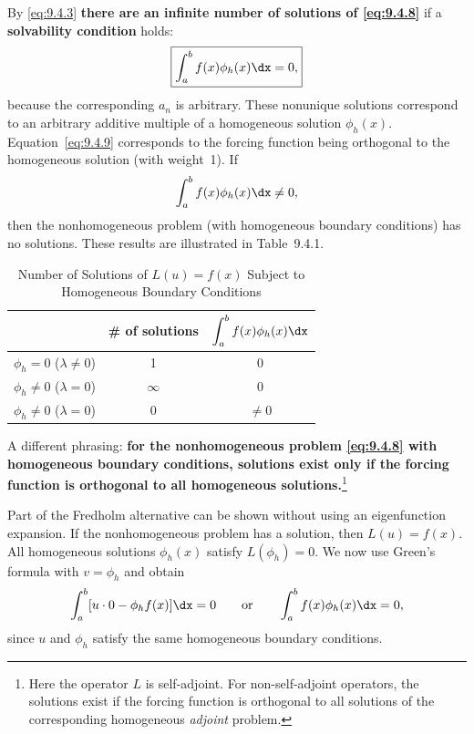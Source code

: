 By \eqref{eq:9.4.3} \textbf{there are an infinite number of solutions of \eqref{eq:9.4.8}} if a \textbf{solvability condition} holds:
\begin{equation}
\label{eq:9.4.9}
\boxed{\int_a^b f(x)\phi_h(x)\dx = 0,}
\end{equation}
because the corresponding $a_n$ is arbitrary.  These nonunique solutions correspond to an arbitrary additive multiple of a homogeneous solution $\phi_h(x)$.  Equation~\eqref{eq:9.4.9} corresponds to the forcing function being orthogonal to the homogeneous solution (with weight~1).  If
\begin{equation}
\label{eq:9.4.10}
\int_a^b f(x)\phi_h(x)\dx \neq 0,
\end{equation}
then the nonhomogeneous problem (with homogeneous boundary conditions) has no solutions.  These results are illustrated in Table~9.4.1.

\begin{table}[H]
\centering
\caption{Number of Solutions of $L(u)=f(x)$ Subject to Homogeneous Boundary Conditions}
\label{tab:9.4.1}
\begin{tabular}{l|c|c}
\toprule
& \# of solutions & $\displaystyle\int_a^b f(x)\phi_h(x)\dx$ \\
\midrule
$\phi_h = 0$ ($\lambda \neq 0$) & 1 & 0 \\
$\phi_h \neq 0$ ($\lambda = 0$) & $\infty$ & 0 \\
$\phi_h \neq 0$ ($\lambda = 0$) & 0 & $\neq 0$ \\
\bottomrule
\end{tabular}
\end{table}

A different phrasing: \textbf{for the nonhomogeneous problem \eqref{eq:9.4.8} with homogeneous boundary conditions, solutions exist only if the forcing function is orthogonal to all homogeneous solutions.}\footnote{Here the operator $L$ is self-adjoint.  For non-self-adjoint operators, the solutions exist if the forcing function is orthogonal to all solutions of the corresponding homogeneous \emph{adjoint} problem.}

Part of the Fredholm alternative can be shown without using an eigenfunction expansion.  If the nonhomogeneous problem has a solution, then $L(u) = f(x)$.  All homogeneous solutions $\phi_h(x)$ satisfy $L(\phi_h) = 0$.  We now use Green's formula with $v = \phi_h$ and obtain
\[
\int_a^b [u \cdot 0 - \phi_h f(x)]\dx = 0 \qquad\text{or}\qquad \int_a^b f(x)\phi_h(x)\dx = 0,
\]
since $u$ and $\phi_h$ satisfy the same homogeneous boundary conditions.

